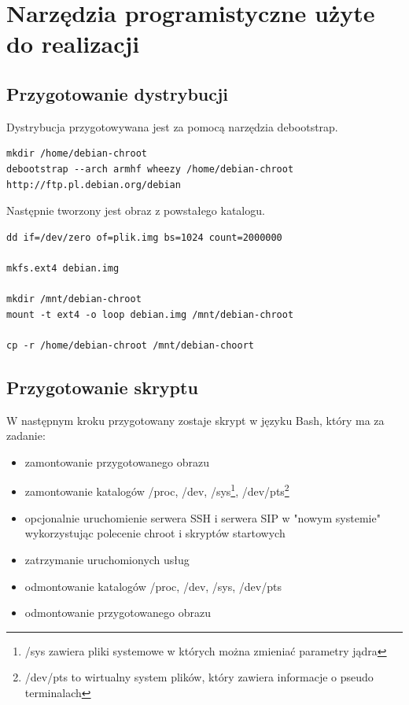 \section{Narzędzia programistyczne użyte do realizacji}


\subsection{Przygotowanie dystrybucji}
Dystrybucja przygotowywana jest za pomocą narzędzia debootstrap.

\begin{lstlisting}
mkdir /home/debian-chroot
debootstrap --arch armhf wheezy /home/debian-chroot http://ftp.pl.debian.org/debian
\end{lstlisting}

Następnie tworzony jest obraz z powstałego katalogu.

\begin{lstlisting}
dd if=/dev/zero of=plik.img bs=1024 count=2000000

mkfs.ext4 debian.img

mkdir /mnt/debian-chroot
mount -t ext4 -o loop debian.img /mnt/debian-chroot

cp -r /home/debian-chroot /mnt/debian-choort
\end{lstlisting}

\subsection{Przygotowanie skryptu}

W następnym kroku przygotowany zostaje skrypt w języku Bash, który ma za zadanie:

\begin{itemize}
	\item zamontowanie przygotowanego obrazu
	\item zamontowanie katalogów /proc, /dev, /sys\footnote{/sys zawiera pliki systemowe w których można zmieniać parametry jądra}, /dev/pts\footnote{/dev/pts to wirtualny system plików, który zawiera informacje o pseudo terminalach}
	\item opcjonalnie uruchomienie serwera SSH i serwera SIP w "nowym systemie" wykorzystując polecenie chroot i skryptów startowych
	\item zatrzymanie uruchomionych usług
	\item odmontowanie katalogów /proc, /dev, /sys, /dev/pts
	\item odmontowanie przygotowanego obrazu
\end{itemize}

